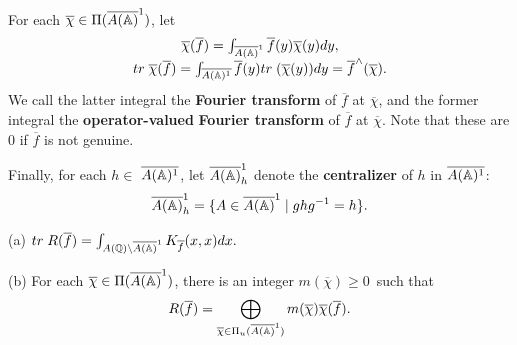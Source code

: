 For each $\overline{\chi }\in \Pi (\overline{A({\Bbb{A}})}^1)$, let 
\begin{equation}
\begin{array}{c}
\overline{\chi }(\overline{f})
=\int_{\overline{A({\Bbb{A}})}^1}
\overline{f}(y)\overline{\chi }(y)dy, \\ 
tr\;\overline{\chi }(\overline{f})
=\int_{\overline{A({\Bbb{A}})^1}}\overline{f}(y)
tr\;(\overline{\chi }(y))dy
=\overline{f}^{\wedge }(\overline{\chi }).
\end{array}
\end{equation}
We call the latter integral the \textbf{Fourier transform}
of $\overline{f}$ at $\overline{\chi }$, and the
former integral the \textbf{operator-valued}
\textbf{Fourier transform} of $\overline{f}$ at
$\overline{\chi }$. Note that these are
$0$ if $\overline{f}$ is not genuine.

Finally, for each $h\in $ $\overline{A({\Bbb{A}})^1}$, let
$\overline{A({\Bbb{A}})}_h^1$ denote the \textbf{centralizer} of $h$
in $\overline{A({\Bbb{A}})^1}$: 
\begin{equation}
\overline{A({\Bbb{A}})}_h^1
=\{A\in \overline{A({\Bbb{A}})}^1\;|\;ghg^{-1}=h\}.
\end{equation}

\begin{theorem}
(a) $tr\;R(\overline{f})
=\int_{A({\Bbb{Q}})\backslash \overline{A({\Bbb{A}})}^1}
K_{\overline{f}}(x,x)dx.$

(b) For each $\overline{\chi }\in \Pi (\overline{A({\Bbb{A}})}^1)$, there is
an integer $m(\overline{\chi })\geq 0$\ such that 
\[
R(\overline{f})
=\bigoplus_{\overline{\chi }\in \Pi_u (\overline{A({\Bbb{A}})}^1)}
m(\overline{\chi })\overline{\chi }(\overline{f}).
\]
\end{theorem}

